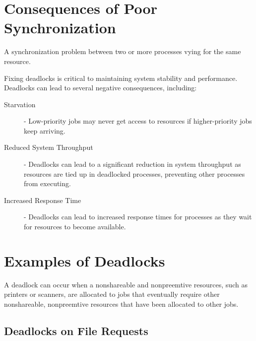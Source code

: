 \documentclass[12pt letter]{report}
\begin{document}
\section{Consequences of Poor Synchronization}


 {
  A synchronization problem between two or more processes vying for
  the same resource.
}


Fixing deadlocks is critical to maintaining system stability and
performance. Deadlocks can lead to several negative consequences,
including:
\begin{description}
  \item[Starvation]  - Low-priority jobs may never get access to
    resources if higher-priority jobs keep arriving.
  \item[Reduced System Throughput]  - Deadlocks can lead to a
    significant reduction in system throughput as resources are
    tied up in deadlocked processes, preventing other processes from
    executing.
  \item[Increased Response Time]  - Deadlocks can lead to increased
    response times for processes as they wait for resources to
    become available.
\end{description}

\section{Examples of Deadlocks}

A deadlock can occur when a nonshareable  and nonpreemtive resources,
such as printers or scanners, are allocated to jobs that eventually
require other nonshareable, nonpreemtive resources that have been
allocated to other jobs.

\subsection{Deadlocks on File Requests}
\end{document}

